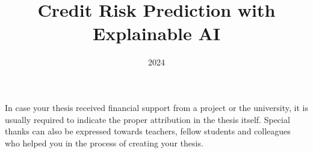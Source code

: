 \documentclass[
]{elteikthesis}[2024/04/26]
\title{Credit Risk Prediction with Explainable AI} %
\date{2024} %
\author{\makecell[l]{Kafi MD Abdullah Hel\\Neptun: N06WMD}}
\affiliation{Assistant Lecturer} %
\begin{document}


\maketitle


\cleardoublepage


\tableofcontents
\cleardoublepage


\cleardoublepage

\chapter*{\acklabel}
In case your thesis received financial support from a project or the university, it is usually required to indicate the proper attribution in the thesis itself. Special thanks can also be expressed towards teachers, fellow students and colleagues who helped you in the process of creating your thesis.

\appendix
\cleardoublepage

{}
\printbibliography[title=\biblabel]
\cleardoublepage

{}
\listoffigures
\cleardoublepage

\cleardoublepage




\end{document}
